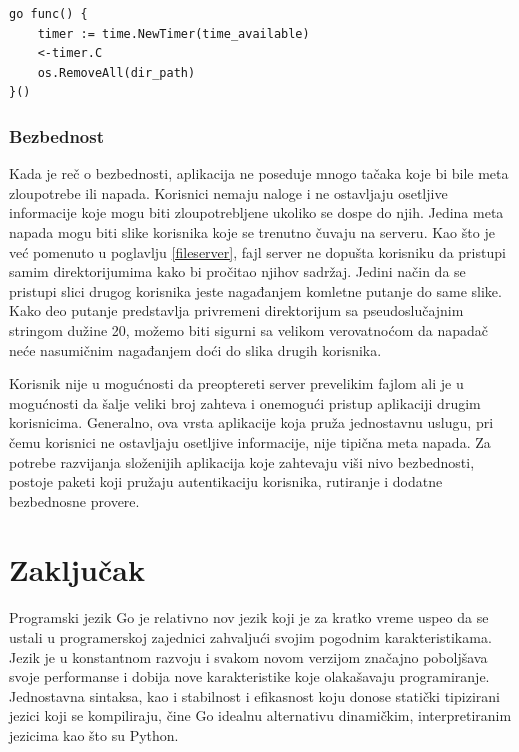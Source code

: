 \documentclass[12pt,oneside]{memoir}
\begin{document}
\begin{center}
\begin{lstlisting}[caption=Gorutina za brisanje privremenih direktorijuma,label={lst:clean},  backgroundcolor=\color{background}]
go func() {
	timer := time.NewTimer(time_available)
	<-timer.C
	os.RemoveAll(dir_path)
}()
\end{lstlisting}
\end{center}


\subsection{Bezbednost}

Kada je reč o bezbednosti, aplikacija ne poseduje mnogo tačaka koje bi bile meta zloupotrebe ili napada. Korisnici nemaju naloge i ne ostavljaju osetljive informacije koje mogu biti zloupotrebljene ukoliko se dospe do njih. Jedina meta napada mogu biti slike korisnika koje se trenutno čuvaju na serveru. Kao što je već pomenuto u poglavlju \ref{fileserver}, fajl server ne dopušta korisniku da pristupi samim direktorijumima kako bi pročitao njihov sadržaj. Jedini način da se pristupi slici drugog korisnika jeste nagađanjem komletne putanje do same slike. Kako deo putanje predstavlja privremeni direktorijum sa pseudoslučajnim stringom dužine 20, možemo biti sigurni sa velikom verovatnoćom da napadač neće nasumičnim nagađanjem doći do slika drugih korisnika. 

Korisnik nije u mogućnosti da preoptereti server prevelikim fajlom ali je u mogućnosti da šalje veliki broj zahteva i onemogući pristup aplikaciji drugim korisnicima. Generalno, ova vrsta aplikacije koja pruža jednostavnu uslugu, pri čemu korisnici ne ostavljaju osetljive informacije, nije tipična meta napada. Za potrebe razvijanja složenijih aplikacija koje zahtevaju viši nivo bezbednosti, postoje paketi koji pružaju autentikaciju korisnika, rutiranje i dodatne bezbednosne provere. 

\chapter{Zaključak}

Programski jezik Go je relativno nov jezik koji je za kratko vreme uspeo da se ustali u programerskoj zajednici zahvaljući svojim pogodnim karakteristikama. Jezik je u konstantnom razvoju i svakom novom verzijom značajno poboljšava svoje performanse i dobija nove karakteristike koje olakašavaju programiranje. Jednostavna sintaksa, kao i stabilnost i efikasnost koju donose statički tipizirani jezici koji se kompiliraju, čine Go idealnu alternativu dinamičkim, interpretiranim jezicima kao što su Python.
\end{document}
